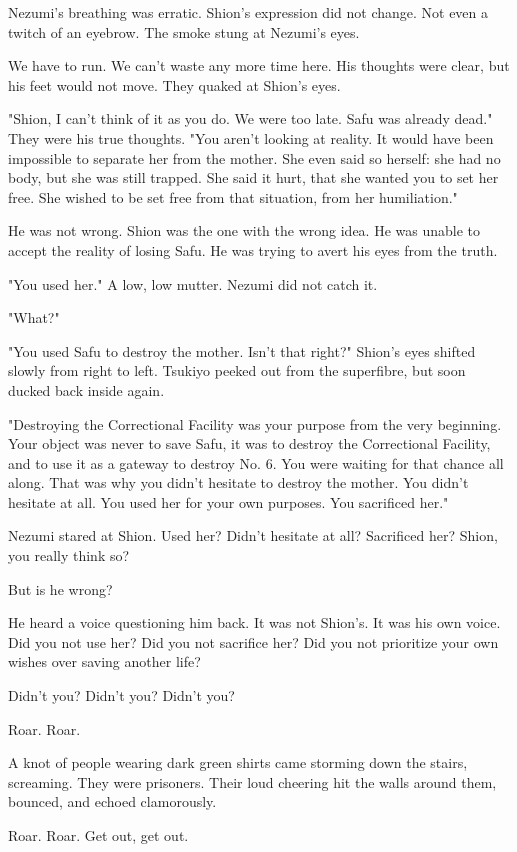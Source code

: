 Nezumi's breathing was erratic. Shion's expression did not change. Not
even a twitch of an eyebrow. The smoke stung at Nezumi's eyes.

We have to run. We can't waste any more time here. His thoughts were
clear, but his feet would not move. They quaked at Shion's eyes.

"Shion, I can't think of it as you do. We were too late. Safu was
already dead." They were his true thoughts. "You aren't looking at
reality. It would have been impossible to separate her from the mother.
She even said so herself: she had no body, but she was still trapped.
She said it hurt, that she wanted you to set her free. She wished to be
set free from that situation, from her humiliation."

He was not wrong. Shion was the one with the wrong idea. He was unable
to accept the reality of losing Safu. He was trying to avert his eyes
from the truth.

"You used her." A low, low mutter. Nezumi did not catch it.

"What?"

"You used Safu to destroy the mother. Isn't that right?" Shion's eyes
shifted slowly from right to left. Tsukiyo peeked out from the
superfibre, but soon ducked back inside again.

"Destroying the Correctional Facility was your purpose from the very
beginning. Your object was never to save Safu, it was to destroy the
Correctional Facility, and to use it as a gateway to destroy No. 6. You
were waiting for that chance all along. That was why you didn't hesitate
to destroy the mother. You didn't hesitate at all. You used her for your
own purposes. You sacrificed her."

Nezumi stared at Shion. Used her? Didn't hesitate at all? Sacrificed
her? Shion, you really think so?

But is he wrong?

He heard a voice questioning him back. It was not Shion's. It was his
own voice. Did you not use her? Did you not sacrifice her? Did you not
prioritize your own wishes over saving another life?

Didn't you? Didn't you? Didn't you?

Roar. Roar.

A knot of people wearing dark green shirts came storming down the
stairs, screaming. They were prisoners. Their loud cheering hit the
walls around them, bounced, and echoed clamorously.

Roar. Roar. Get out, get out.

